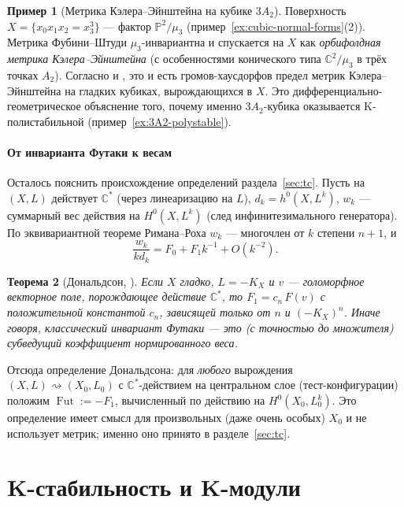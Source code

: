 \documentclass[11pt,a4paper]{article}
\theoremstyle{plain}
\newtheorem{theorem}{Теорема}[section]
\theoremstyle{definition}
\newtheorem{example}[theorem]{Пример}
\theoremstyle{remark}
\renewcommand{\C}{\mathbb{C}}
\newcommand{\PP}{\mathbb{P}}
\DeclareMathOperator{\Fut}{Fut}
\begin{document}
\begin{example}[Метрика Кэлера--Эйнштейна на кубике $3A_2$]
Поверхность $X=\{x_0x_1x_2=x_3^3\}$ --- фактор $\PP^2/\mu_3$ (пример~\ref{ex:cubic-normal-forms}(2)).
Метрика Фубини--Штуди $\mu_3$-инвариантна и спускается на $X$ как \emph{орбифолдная метрика Кэлера--Эйнштейна}
(с особенностями конического типа $\C^2/\mu_3$ в трёх точках $A_2$). Согласно \cite{OSS} и
\cite{DS14}, это и есть громов-хаусдорфов предел метрик Кэлера--Эйнштейна на гладких кубиках, вырождающихся в $X$.
Это дифференциально-геометрическое объяснение того, почему именно $3A_2$-кубика оказывается
K-полистабильной (пример~\ref{ex:3A2-polystable}).
\end{example}

\subsection{От инварианта Футаки к весам}

Осталось пояснить происхождение определений раздела~\ref{sec:tc}. Пусть на
$(X,L)$ действует $\C^*$ (через линеаризацию на $L$), $d_k=h^0(X,L^k)$, $w_k$ --- суммарный вес
действия на $H^0(X,L^k)$ (след инфинитезимального генератора). По эквивариантной теореме
Римана--Роха $w_k$ --- многочлен от $k$ степени $n+1$, и
\[
\frac{w_k}{kd_k}=F_0+F_1k^{-1}+O(k^{-2}).
\]

\begin{theorem}[{Дональдсон, \cite[2.2]{Don02}}]\label{thm:Donaldson-Futaki}
Если $X$ гладко, $L=-K_X$ и $v$ --- голоморфное векторное поле, порождающее действие $\C^*$, то
$F_1=c_n\,F(v)$ с положительной константой $c_n$, зависящей только от $n$ и $(-K_X)^n$. Иначе
говоря, классический инвариант Футаки --- это \textup{(}с точностью до множителя\textup{)} субведущий коэффициент
нормированного веса.
\end{theorem}

Отсюда определение Дональдсона: для \emph{любого} вырождения $(X,L)\rightsquigarrow(X_0,L_0)$ с
$\C^*$-действием на центральном слое (тест-конфигурации) положим $\Fut:=-F_1$, вычисленный по
действию на $H^0(X_0,L_0^k)$. Это определение имеет смысл для произвольных (даже очень особых)
$X_0$ и не использует метрик; именно оно принято в разделе~\ref{sec:tc}.

\part{K-стабильность и K-модули}

\end{document}

